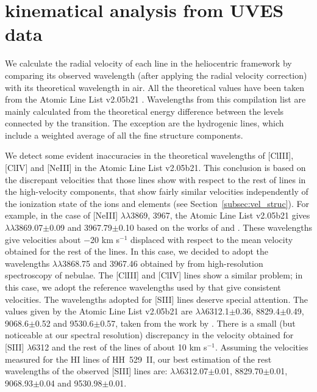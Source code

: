 \documentclass[fleqn,usenatbib]{mnras}
\begin{document}
\section{kinematical analysis from UVES data}
\label{sec:kin_analisys}

We calculate the radial velocity of each line in the heliocentric framework by comparing its observed wavelength (after applying the radial velocity correction) with its theoretical  wavelength in air. All the theoretical values have been taken from the Atomic Line List v2.05b21 \citep{vanhoof18}. Wavelengths from this compilation list are mainly calculated from the theoretical energy difference between the levels connected by the transition. The exception are the hydrogenic lines, which include a weighted average of all the fine structure components. 

We detect some evident inaccuracies in the theoretical wavelengths of \mbox{[Cl}\thinspace \mbox{III]}, \mbox{[Cl}\thinspace \mbox{IV]} and \mbox{[Ne}\thinspace \mbox{III]} in the Atomic Line List v2.05b21. This conclusion is based on the discrepant velocities that those lines show with respect to the rest of lines in the high-velocity components, that show fairly similar velocities independently of the ionization state of the ions and elements (see Section~\ref{subsec:vel_struc}). For example, in the case of \mbox{[Ne}\thinspace \mbox{III]} $\lambda \lambda$3869, 3967, the Atomic Line List v2.05b21 gives $\lambda \lambda$3869.07$\pm$0.09 and 3967.79$\pm$0.10 based on the works of \citet{Persson91} and \citet{Feuchtgruber97}. These wavelengths give velocities about $-$20 km s$^{-1}$ displaced with respect to the mean velocity obtained for the rest of the lines. In this case, we decided to adopt the wavelengths $\lambda \lambda$3868.75 and 3967.46 obtained by \citet{Bowen55} from high-resolution spectroscopy of nebulae. The \mbox{[Cl}\thinspace \mbox{III]} and \mbox{[Cl}\thinspace \mbox{IV]} lines show a similar problem;  in this case, we adopt the reference wavelengths used by \citet{Esteban04} that give consistent velocities. The wavelengths adopted for \mbox{[S}\thinspace \mbox{III]} lines deserve special attention. The values given by the Atomic Line List v2.05b21 are $\lambda \lambda$6312.1$\pm$0.36, 8829.4$\pm$0.49, 9068.6$\pm$0.52 and 9530.6$\pm$0.57, taken from the work by \citet{Kaufman93}. There is a small (but noticeable at our spectral resolution) discrepancy in the velocity obtained for [S\thinspace III] $\lambda$6312 and the rest of the lines of about 10 km s$^{-1}$. Assuming the velocities measured for the H\thinspace I lines of HH~529~II, our best estimation of the rest wavelengths of the observed \mbox{[S}\thinspace \mbox{III]} lines are: $\lambda\lambda$6312.07$\pm$0.01, 8829.70$\pm$0.01, 9068.93$\pm$0.04 and 9530.98$\pm$0.01. 
\end{document}
